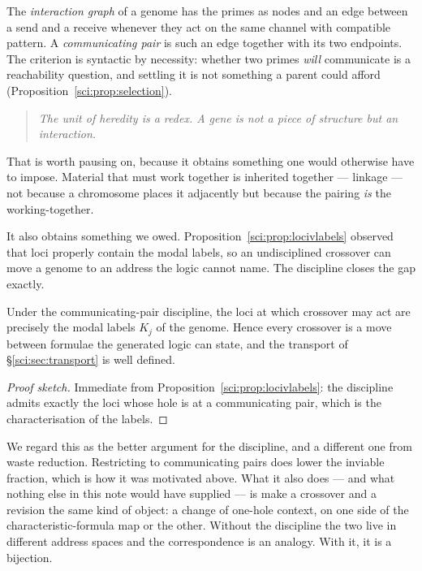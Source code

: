 \begin{definition}
\label{sci:def:intgraph}
The \emph{interaction graph} of a genome has the primes as nodes and an edge between a send and a
receive whenever they act on the same channel with compatible pattern. A \emph{communicating pair} is
such an edge together with its two endpoints. The criterion is syntactic by necessity: whether two
primes \emph{will} communicate is a reachability question, and settling it is not something a parent
could afford (Proposition~\ref{sci:prop:selection}).
\end{definition}

\begin{quote}
\itshape The unit of heredity is a redex. A gene is not a piece of structure but an interaction.
\end{quote}

That is worth pausing on, because it obtains something one would otherwise have to impose. Material
that must work together is inherited together --- linkage --- not because a chromosome places it
adjacently but because the pairing \emph{is} the working-together.

It also obtains something we owed. Proposition~\ref{sci:prop:locivlabels} observed that loci properly
contain the modal labels, so an undisciplined crossover can move a genome to an address the logic
cannot name. The discipline closes the gap exactly.

\begin{proposition}
\label{sci:prop:alignment}
Under the communicating-pair discipline, the loci at which crossover may act are precisely the
modal labels $K_j$ of the genome. Hence every crossover is a move between formulae the generated
logic can state, and the transport of \S\ref{sci:sec:transport} is well defined.
\end{proposition}
\begin{proof}[Proof sketch]
Immediate from Proposition~\ref{sci:prop:locivlabels}: the discipline admits exactly the loci whose
hole is at a communicating pair, which is the characterisation of the labels.
\end{proof}

We regard this as the better argument for the discipline, and a different one from waste reduction.
Restricting to communicating pairs does lower the inviable fraction, which is how it was motivated
above. What it also does --- and what nothing else in this note would have supplied --- is make a
crossover and a revision the same kind of object: a change of one-hole context, on one side of the
characteristic-formula map or the other. Without the discipline the two live in different address
spaces and the correspondence is an analogy. With it, it is a bijection.

